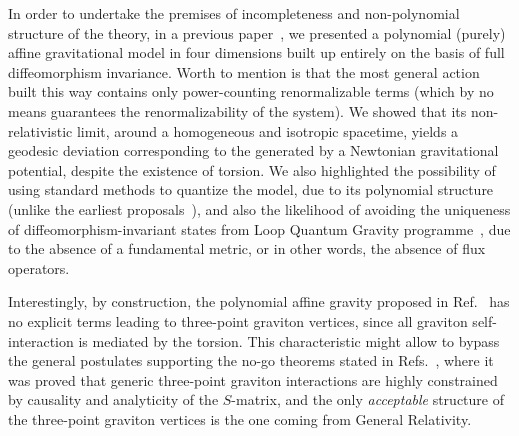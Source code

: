\documentclass[aps,prd,12pt,twocolumn,superscriptaddress,showpacs,showkeys,reprint%
]{revtex4-1}
\renewcommand{\(}{\left(}
\renewcommand{\)}{\right)}
\renewcommand{\[}{\left[}
\renewcommand{\]}{\right]}
\begin{document}
In order to undertake the premises of incompleteness and non-polynomial structure of the theory, in a previous paper~\cite{Skirzewski:2014eta}, we presented a polynomial (purely) affine gravitational model in four dimensions built up entirely on the basis of full diffeomorphism invariance. Worth to mention is that the most general action built this way contains only power-counting renormalizable terms (which by no means guarantees the renormalizability of the system). We showed that its non-relativistic limit, around a homogeneous and isotropic spacetime, yields a geodesic deviation corresponding to the generated by a Newtonian gravitational potential, despite the existence of torsion. We also highlighted the possibility of using standard methods to quantize the model, due to its polynomial structure (unlike the earliest proposals~\cite{Eddington1923math,schrodinger1950space}), and also the likelihood of avoiding the uniqueness of diffeomorphism-invariant states from Loop Quantum Gravity programme~\cite{Lewandowski:2005jk}, due to the absence of a fundamental metric, or in other words, the absence of flux operators.

Interestingly, by construction, the polynomial affine gravity proposed in Ref.~\cite{Skirzewski:2014eta} has no explicit terms leading to three-point graviton vertices, since all graviton self-interaction is mediated by the torsion. This characteristic might allow to bypass the general postulates supporting the no-go theorems stated in Refs.~\cite{McGady:2013sga,Camanho:2014apa}, where it was proved that generic three-point graviton interactions are highly constrained by causality and analyticity of the $S$-matrix, and the only \emph{acceptable} structure of the three-point graviton vertices is the one coming from General Relativity.
\end{document}
